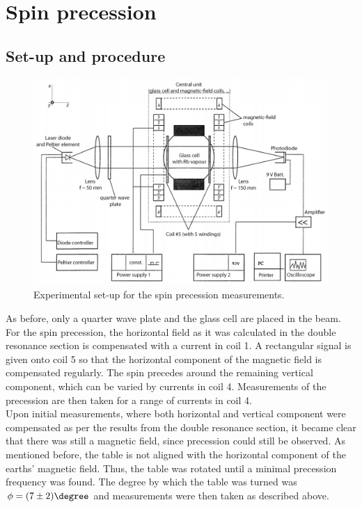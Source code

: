 \section{Spin precession}
\subsection{Set-up and procedure}
\begin{figure}
\centering
\includegraphics[width=1.0\linewidth]{graphics/spinprecessionsetup}
\caption[Spin precession set-up]{Experimental set-up for the spin precession measurements. \cite{anleitung}}
\label{fig:spinprecessionsetup}
\end{figure}
As before, only a quarter wave plate and the glass cell are placed in the beam. For the spin precession, the horizontal field as it was calculated in the double resonance section is compensated with a current in coil 1. A rectangular signal is given onto coil 5 so that the horizontal component of the magnetic field is compensated regularly. The spin precedes around the remaining vertical component, which can be varied by currents in coil 4. Measurements of the precession are then taken for a range of currents in coil 4.\\

Upon initial measurements, where both horizontal and vertical component were compensated as per the results from the double resonance section, it became clear that there was still a magnetic field, since precession could still be observed. As mentioned before, the table is not aligned with the horizontal component of the earths' magnetic field. Thus, the table was rotated until a minimal precession frequency was found. The degree by which the table was turned was $\phi=\unit{(7\pm2)}{\degree}$ and measurements were then taken as described above.

